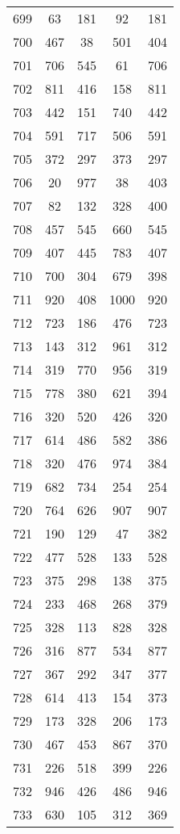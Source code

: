 \documentclass[a4paper,10pt,ngerman]{scrartcl}
\begin{document}
\begin{longtable}[c]{c|c|c|c|c}
    699 & 63 & 181 & 92 & 181 \\
    700 & 467 & 38 & 501 & 404 \\
    701 & 706 & 545 & 61 & 706 \\
    702 & 811 & 416 & 158 & 811 \\
    703 & 442 & 151 & 740 & 442 \\
    704 & 591 & 717 & 506 & 591 \\
    705 & 372 & 297 & 373 & 297 \\
    706 & 20 & 977 & 38 & 403 \\
    707 & 82 & 132 & 328 & 400 \\
    708 & 457 & 545 & 660 & 545 \\
    709 & 407 & 445 & 783 & 407 \\
    710 & 700 & 304 & 679 & 398 \\
    711 & 920 & 408 & 1000 & 920 \\
    712 & 723 & 186 & 476 & 723 \\
    713 & 143 & 312 & 961 & 312 \\
    714 & 319 & 770 & 956 & 319 \\
    715 & 778 & 380 & 621 & 394 \\
    716 & 320 & 520 & 426 & 320 \\
    717 & 614 & 486 & 582 & 386 \\
    718 & 320 & 476 & 974 & 384 \\
    719 & 682 & 734 & 254 & 254 \\
    720 & 764 & 626 & 907 & 907 \\
    721 & 190 & 129 & 47 & 382 \\
    722 & 477 & 528 & 133 & 528 \\
    723 & 375 & 298 & 138 & 375 \\
    724 & 233 & 468 & 268 & 379 \\
    725 & 328 & 113 & 828 & 328 \\
    726 & 316 & 877 & 534 & 877 \\
    727 & 367 & 292 & 347 & 377 \\
    728 & 614 & 413 & 154 & 373 \\
    729 & 173 & 328 & 206 & 173 \\
    730 & 467 & 453 & 867 & 370 \\
    731 & 226 & 518 & 399 & 226 \\
    732 & 946 & 426 & 486 & 946 \\
    733 & 630 & 105 & 312 & 369 \\

\end{longtable}
\end{document}
